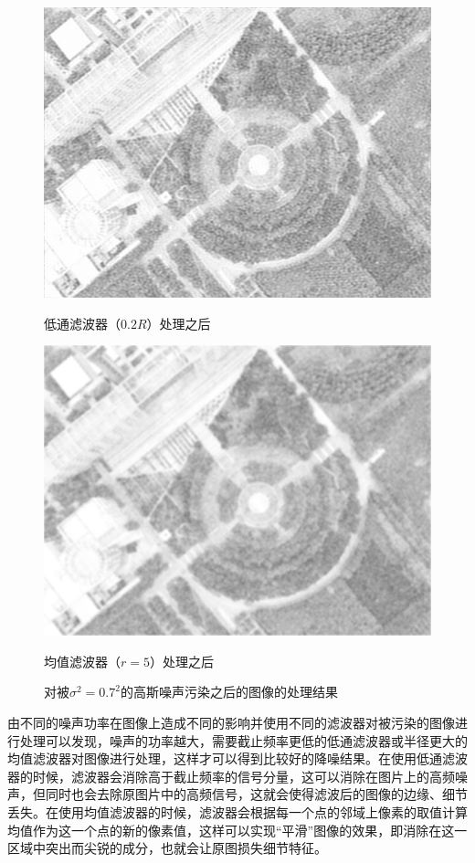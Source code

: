 \begin{figure}[H]
	\centering
	\begin{minipage}{0.45\linewidth}
		\includegraphics[width=\linewidth]{figure/DJI_0027_Processed_by_LP_70}
		\caption{低通滤波器（$0.2R$）处理之后}
	\end{minipage}
	\begin{minipage}{0.45\linewidth}
		\includegraphics[width=\linewidth]{figure/DJI_0027_Processed_by_MF_70}
		\caption{均值滤波器（$r=5$）处理之后}
	\end{minipage}
	\caption{对被$\sigma^2=0.7^2$的高斯噪声污染之后的图像的处理结果}
	\label{fig:sigma70}
\end{figure}
由不同的噪声功率在图像上造成不同的影响并使用不同的滤波器对被污染的图像进行处理可以发现，噪声的功率越大，需要截止频率更低的低通滤波器或半径更大的均值滤波器对图像进行处理，这样才可以得到比较好的降噪结果。在使用低通滤波器的时候，滤波器会消除高于截止频率的信号分量，这可以消除在图片上的高频噪声，但同时也会去除原图片中的高频信号，这就会使得滤波后的图像的边缘、细节丢失。在使用均值滤波器的时候，滤波器会根据每一个点的邻域上像素的取值计算均值作为这一个点的新的像素值，这样可以实现“平滑”图像的效果，即消除在这一区域中突出而尖锐的成分，也就会让原图损失细节特征。